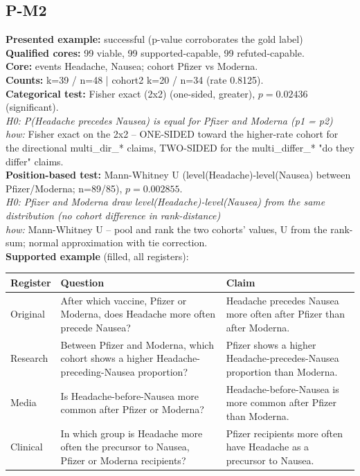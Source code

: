 \documentclass[11pt]{article}
\begin{document}
\subsection*{P-M2}
\textbf{Presented example:} successful (p-value corroborates the gold label) \\
\textbf{Qualified cores:} 99 viable, 99 supported-capable, 99 refuted-capable. \\
\textbf{Core:} events Headache, Nausea; cohort Pfizer vs Moderna. \\
\textbf{Counts:} k=39 / n=48  |  cohort2 k=20 / n=34  (rate 0.8125). \\
\textbf{Categorical test:} Fisher exact (2x2) (one-sided, greater), $p = 0.02436$ (significant). \\
\emph{H0: P(Headache precedes Nausea) is equal for Pfizer and Moderna (p1 = p2)} \\
\emph{how:} Fisher exact on the 2x2 -- ONE-SIDED toward the higher-rate cohort for the directional multi\_dir\_* claims, TWO-SIDED for the multi\_differ\_* "do they differ" claims. \\
\textbf{Position-based test:} Mann-Whitney U (level(Headache)-level(Nausea) between Pfizer/Moderna; n=89/85), $p = 0.002855$. \\
\emph{H0: Pfizer and Moderna draw level(Headache)-level(Nausea) from the same distribution (no cohort difference in rank-distance)} \\
\emph{how:} Mann-Whitney U -- pool and rank the two cohorts' values, U from the rank-sum; normal approximation with tie correction. \\
\textbf{Supported example} (filled, all registers): \\
\begin{tabularx}{\linewidth}{@{}l L L@{}}
\toprule
\textbf{Register} & \textbf{Question} & \textbf{Claim} \\
\midrule
Original & After which vaccine, Pfizer or Moderna, does Headache more often precede Nausea? & Headache precedes Nausea more often after Pfizer than after Moderna. \\
Research & Between Pfizer and Moderna, which cohort shows a higher Headache-preceding-Nausea proportion? & Pfizer shows a higher Headache-precedes-Nausea proportion than Moderna. \\
Media & Is Headache-before-Nausea more common after Pfizer or Moderna? & Headache-before-Nausea is more common after Pfizer than Moderna. \\
Clinical & In which group is Headache more often the precursor to Nausea, Pfizer or Moderna recipients? & Pfizer recipients more often have Headache as a precursor to Nausea. \\
\bottomrule
\end{tabularx}
\end{document}
